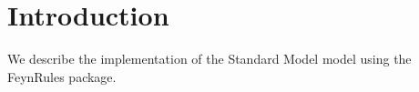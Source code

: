 \section{\label{introduction}Introduction}
We describe the implementation of the Standard Model model using the FeynRules \cite{Christensen:2008py} package.
